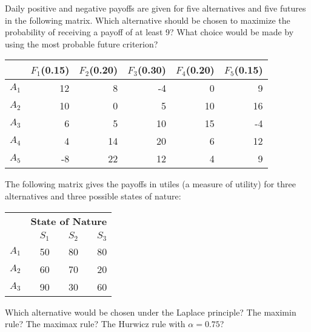 \begin{exercises}
    \begin{exercise}
    \label{sea-7-37}
        Daily positive and negative payoffs are given for five alternatives and five futures in the following matrix. Which alternative should be chosen to maximize the probability of receiving a payoff of at least 9? What choice would be made by using the most probable future criterion?
        \begin{table}[h]
        \centering
        \begin{tabular}{r r r r r r}
        \toprule
         & \textbf{$F_1$(0.15)} & \textbf{$F_2$(0.20)} & \textbf{$F_3$(0.30)} & \textbf{$F_4$(0.20)} & \textbf{$F_5$(0.15)} \\
        \midrule
        $A_1$ & 12 &  8 & -4 &  0 &  9 \\
        $A_2$ & 10 &  0 &  5 & 10 & 16 \\
        $A_3$ &  6 &  5 & 10 & 15 & -4 \\
        $A_4$ &  4 & 14 & 20 &  6 & 12 \\
        $A_5$ & -8 & 22 & 12 &  4 &  9 \\
        \bottomrule
        \end{tabular}
        \label{tab:sea-7-37} %
        \end{table}
    \end{exercise}
    \begin{solution}
    \end{solution}
    
    \begin{exercise}
    \label{sea-7-38}
        The following matrix gives the payoffs in utiles (a measure of utility) for three alternatives and three possible states of nature:
        \begin{table}[h]
        \centering
        \begin{tabular}{r r r r}
        \toprule
         & \multicolumn{3}{c}{\textbf{State of Nature}} \\
         & \textbf{$S_1$} & \textbf{$S_2$} & \textbf{$S_3$} \\
        \midrule
        $A_1$ & 50 & 80 & 80 \\
        $A_2$ & 60 & 70 & 20 \\
        $A_3$ & 90 & 30 & 60 \\
        \bottomrule
        \end{tabular}
        \label{tab:sea-7-38} %
        \end{table}
        Which alternative would be chosen under the Laplace principle? The maximin rule? The maximax rule? The Hurwicz rule with  $\alpha=0.75$?
    \end{exercise}
    \begin{solution}
    \end{solution}
    

\end{exercises}
